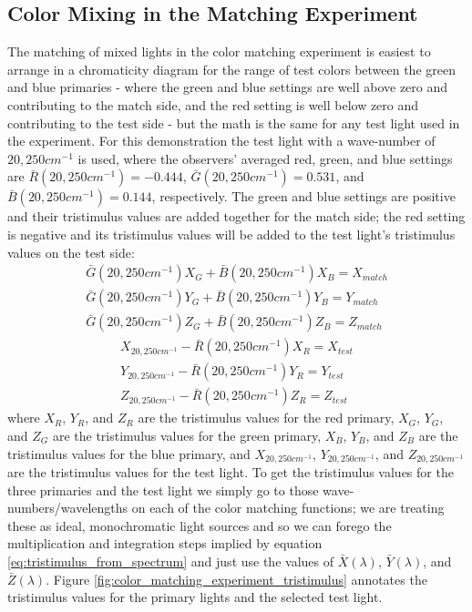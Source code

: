 \documentclass[twocolumn]{article}
\begin{document}
\subsection{Color Mixing in the Matching Experiment}
The matching of mixed lights in the color matching experiment is easiest to arrange in a chromaticity diagram for the range of test colors between the green and blue primaries - where the green and blue settings are well above zero and contributing to the match side, and the red setting is well below zero and contributing to the test side - but the math is the same for any test light used in the experiment.  For this demonstration the test light with a wave-number of $20,250cm^{-1}$ is used, where the observers' averaged red, green, and blue settings are $\bar{R}(20,250cm^{-1})=-0.444$, $\bar{G}(20,250cm^{-1})=0.531$, and $\bar{B}(20,250cm^{-1})=0.144$, respectively.  The green and blue settings are positive and their tristimulus values are added together for the match side; the red setting is negative and its tristimulus values will be added to the test light's tristimulus values on the test side:
\begin{equation}\label{eq:match_tristimulus}
    \begin{aligned}
        \bar{G}(20,250cm^{-1})X_G+\bar{B}(20,250cm^{-1})X_B=X_{match}\\
        \bar{G}(20,250cm^{-1})Y_G+\bar{B}(20,250cm^{-1})Y_B=Y_{match}\\
        \bar{G}(20,250cm^{-1})Z_G+\bar{B}(20,250cm^{-1})Z_B=Z_{match}
    \end{aligned}
\end{equation}
\begin{equation}\label{eq:test_tristimulus}
    \begin{aligned}
        X_{20,250cm^{-1}}-\bar{R}(20,250cm^{-1})X_R=X_{test}\\
        Y_{20,250cm^{-1}}-\bar{R}(20,250cm^{-1})Y_R=Y_{test}\\
        Z_{20,250cm^{-1}}-\bar{R}(20,250cm^{-1})Z_R=Z_{test}
    \end{aligned}
\end{equation}
where $X_R$, $Y_R$, and $Z_R$ are the tristimulus values for the red primary, $X_G$, $Y_G$, and $Z_G$ are the tristimulus values for the green primary, $X_B$, $Y_B$, and $Z_B$ are the tristimulus values for the blue primary, and $X_{20,250cm^{-1}}$, $Y_{20,250cm^{-1}}$, and $Z_{20,250cm^{-1}}$ are the tristimulus values for the test light.  To get the tristimulus values for the three primaries and the test light we simply go to those wave-numbers/wavelengths on each of the color matching functions; we are treating these as ideal, monochromatic light sources and so we can forego the multiplication and integration steps implied by equation \ref{eq:tristimulus_from_spectrum} and just use the values of $\bar{X}(\lambda)$, $\bar{Y}(\lambda)$, and $\bar{Z}(\lambda)$.  Figure \ref{fig:color_matching_experiment_tristimulus} annotates the tristimulus values for the primary lights and the selected test light.
\end{document}
